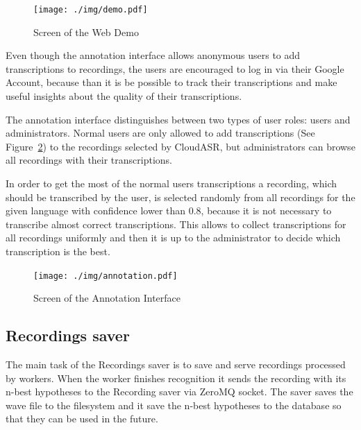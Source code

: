 \begin{figure}[h]
  \centering
  \texttt{[image: ./img/demo.pdf]}

  \caption{Screen of the Web Demo}
  \label{fig:webdemo}
\end{figure}

Even though the annotation interface allows anonymous users to add transcriptions to recordings,
  the users are encouraged to log in via their Google Account,
  because than it is be possible to track their transcriptions
    and make useful insights about the quality of their transcriptions.

The annotation interface distinguishes between two types of user roles: users and administrators.
Normal users are only allowed to add transcriptions (See Figure~\ref{fig:annotation-interface}) to the recordings selected by CloudASR,
  but administrators can browse all recordings with their transcriptions.

In order to get the most of the normal users transcriptions
  a recording, which should be transcribed by the user,
  is selected randomly from all recordings for the given language with confidence lower than 0.8,
    because it is not necessary to transcribe almost correct transcriptions.
This allows to collect transcriptions for all recordings uniformly
  and then it is up to the administrator to decide which transcription is the best.

\begin{figure}[h]
  \centering
  \texttt{[image: ./img/annotation.pdf]}

  \caption{Screen of the Annotation Interface}
  \label{fig:annotation-interface}
\end{figure}



\subsection{Recordings saver}
The main task of the Recordings saver is to save and serve recordings processed by workers.
When the worker finishes recognition
  it sends the recording with its n-best hypotheses to the Recording saver via ZeroMQ socket.
The saver saves the wave file to the filesystem
  and it save the n-best hypotheses to the database so that they can be used in the future.


